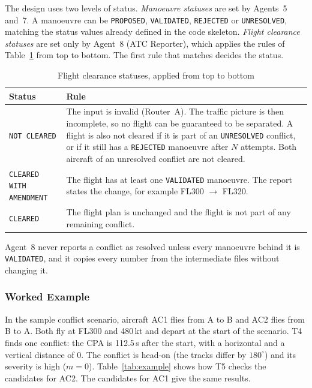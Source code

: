 The design uses two levels of status. \emph{Manoeuvre statuses} are set by Agents~5 and~7. A manoeuvre can be \texttt{PROPOSED}, \texttt{VALIDATED}, \texttt{REJECTED} or \texttt{UNRESOLVED}, matching the status values already defined in the code skeleton. \emph{Flight clearance statuses} are set only by Agent~8 (ATC Reporter), which applies the rules of Table~\ref{tab:clearance} from top to bottom. The first rule that matches decides the status.

\begin{table}[H]
\centering
\caption{Flight clearance statuses, applied from top to bottom}
\label{tab:clearance}
\small
\begin{tabularx}{\linewidth}{@{}l >{\raggedright\arraybackslash}X@{}}
\toprule
\textbf{Status} & \textbf{Rule} \\
\midrule
\texttt{NOT CLEARED} & The input is invalid (Router~A). The traffic picture is then incomplete, so no flight can be guaranteed to be separated. A flight is also not cleared if it is part of an \texttt{UNRESOLVED} conflict, or if it still has a \texttt{REJECTED} manoeuvre after $N$ attempts. Both aircraft of an unresolved conflict are not cleared. \\
\texttt{CLEARED WITH AMENDMENT} & The flight has at least one \texttt{VALIDATED} manoeuvre. The report states the change, for example FL300 $\rightarrow$ FL320. \\
\texttt{CLEARED} & The flight plan is unchanged and the flight is not part of any remaining conflict. \\
\bottomrule
\end{tabularx}
\end{table}

Agent~8 never reports a conflict as resolved unless every manoeuvre behind it is \texttt{VALIDATED}, and it copies every number from the intermediate files without changing it.

\subsubsection{Worked Example}\label{sec:worked-example}

In the sample conflict scenario, aircraft AC1 flies from A to B and AC2 flies from B to A. Both fly at FL300 and 480\,kt and depart at the start of the scenario. T4 finds one conflict: the CPA is 112.5\,s after the start, with a horizontal and a vertical distance of 0. The conflict is head-on (the tracks differ by $180^\circ$) and its severity is high ($m = 0$). Table~\ref{tab:example} shows how T5 checks the candidates for AC2. The candidates for AC1 give the same results.

